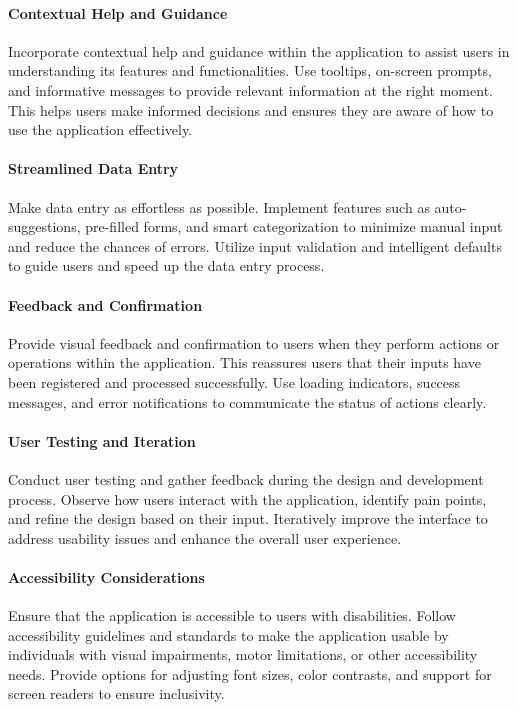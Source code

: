 \paragraph{Contextual Help and Guidance}
Incorporate contextual help and guidance within the application to assist users in 
understanding its features and functionalities. Use tooltips, on-screen prompts, and informative messages to 
provide relevant information at the right moment. This helps users make informed decisions and ensures they are 
aware of how to use the application effectively.

\paragraph{Streamlined Data Entry}
Make data entry as effortless as possible. Implement features such as auto-suggestions, 
pre-filled forms, and smart categorization to minimize manual input and reduce the chances of errors. Utilize 
input validation and intelligent defaults to guide users and speed up the data entry process.

\paragraph{Feedback and Confirmation}
Provide visual feedback and confirmation to users when they perform actions or operations 
within the application. This reassures users that their inputs have been registered and processed successfully. 
Use loading indicators, success messages, and error notifications to communicate the status of actions clearly.

\paragraph{User Testing and Iteration}
Conduct user testing and gather feedback during the design and development process. 
Observe how users interact with the application, identify pain points, and refine the design based on their input. 
Iteratively improve the interface to address usability issues and enhance the overall user experience.

\paragraph{Accessibility Considerations}
Ensure that the application is accessible to users with disabilities. Follow 
accessibility guidelines and standards to make the application usable by individuals with visual impairments, 
motor limitations, or other accessibility needs. Provide options for adjusting font sizes, color contrasts, and 
support for screen readers to ensure inclusivity.\\
\\

